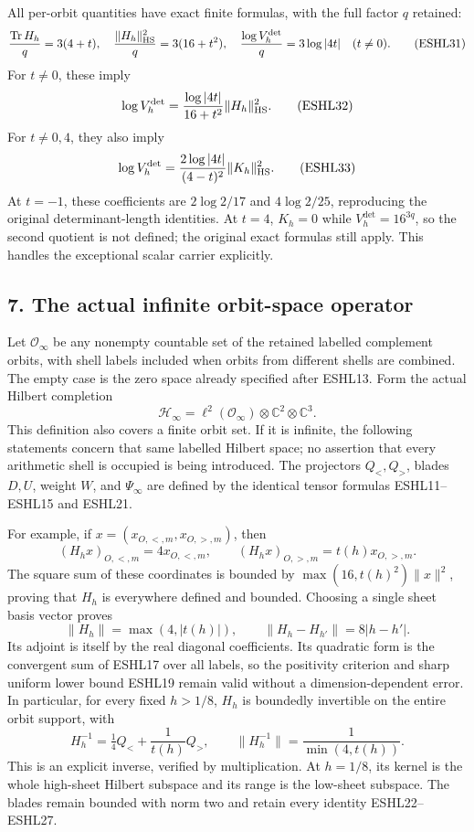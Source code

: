 \documentclass[
  10pt,
  a4paper,
]{article}
\begin{document}
All per-orbit quantities have exact finite formulas, with the full
factor \(q\) retained: \[
\frac{\operatorname{Tr}H_h}{q}=3(4+t),\quad
\frac{\|H_h\|_{\rm HS}^2}{q}=3(16+t^2),\quad
\frac{\log V_h^{\det}}q=3\log|4t|\quad(t\ne0).
\tag{ESHL31}
\] For \(t\ne0\), these imply \[
\log V_h^{\det}
=\frac{\log|4t|}{16+t^2}\|H_h\|_{\rm HS}^2.
\tag{ESHL32}
\] For \(t\ne0,4\), they also imply \[
\log V_h^{\det}
=\frac{2\log|4t|}{(4-t)^2}\|K_h\|_{\rm HS}^2.
\tag{ESHL33}
\] At \(t=-1\), these coefficients are \(2\log2/17\) and \(4\log2/25\),
reproducing the original determinant-length identities. At \(t=4\),
\(K_h=0\) while \(V_h^{\det}=16^{3q}\), so the second quotient is not
defined; the original exact formulas still apply. This handles the
exceptional scalar carrier explicitly.

\subsection{7. The actual infinite orbit-space
operator}\label{the-actual-infinite-orbit-space-operator}

Let \(\mathcal O_\infty\) be any nonempty countable set of the retained
labelled complement orbits, with shell labels included when orbits from
different shells are combined. The empty case is the zero space already
specified after ESHL13. Form the actual Hilbert completion \[
\mathcal H_\infty=\ell^2(\mathcal O_\infty)\otimes\mathbb C^2\otimes\mathbb C^3.
\tag{ESHL34}
\] This definition also covers a finite orbit set. If it is infinite,
the following statements concern that same labelled Hilbert space; no
assertion that every arithmetic shell is occupied is being introduced.
The projectors \(Q_<,Q_>\), blades \(D,U\), weight \(W\), and
\(\Psi_\infty\) are defined by the identical tensor formulas
ESHL11--ESHL15 and ESHL21.

For example, if \(x=(x_{O,<,m},x_{O,>,m})\), then \[
(H_hx)_{O,<,m}=4x_{O,<,m},\qquad
(H_hx)_{O,>,m}=t(h)x_{O,>,m}.
\tag{ESHL35}
\] The square sum of these coordinates is bounded by
\(\max(16,t(h)^2)\|x\|^2\), proving that \(H_h\) is everywhere defined
and bounded. Choosing a single sheet basis vector proves \[
\|H_h\|=\max(4,|t(h)|),\qquad
\|H_h-H_{h'}\|=8|h-h'|.
\tag{ESHL36}
\] Its adjoint is itself by the real diagonal coefficients. Its
quadratic form is the convergent sum of ESHL17 over all labels, so the
positivity criterion and sharp uniform lower bound ESHL19 remain valid
without a dimension-dependent error. In particular, for every fixed
\(h>1/8\), \(H_h\) is boundedly invertible on the entire orbit support,
with \[
H_h^{-1}=\tfrac14Q_<+\frac1{t(h)}Q_>,
\qquad\|H_h^{-1}\|=\frac1{\min(4,t(h))}.
\tag{ESHL37}
\] This is an explicit inverse, verified by multiplication. At
\(h=1/8\), its kernel is the whole high-sheet Hilbert subspace and its
range is the low-sheet subspace. The blades remain bounded with norm two
and retain every identity ESHL22--ESHL27.
\end{document}
